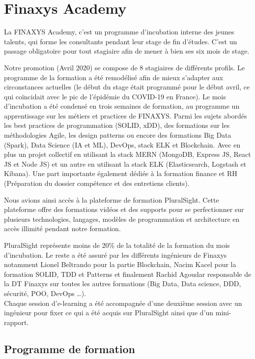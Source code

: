 \section{Finaxys Academy} 
\par La FINAXYS Academy, c’est un programme d'incubation interne des jeunes talents, qui forme les consultants pendant leur stage de fin d’études. C'est un passage obligatoire pour tout stagiaire afin de mener à bien ses six mois de stage. 
\par Notre promotion (Avril 2020) se compose de 8 stagiaires de différents profils. Le programme de la formation a été remodélisé afin de mieux s'adapter aux circonstances actuelles (le début du stage était programmé pour le début avril, ce qui coïncidait avec le pic de l'épidémie du COVID-19 en France). Le mois d'incubation a été condensé en trois semaines de formation, au programme un apprentissage sur les métiers et practices de FINAXYS. Parmi les sujets abordés les best practices de programmation (SOLID, xDD), des formations sur les méthodologies Agile, les design patterns ou encore des formations Big Data (Spark), Data Science (IA et ML), DevOps, stack ELK  et Blockchain. Avec en plus un projet collectif en utilisant la stack MERN (MongoDB, Express JS, React JS et Node JS) et un autre en utilisant la stack ELK (Elasticsearch, Logstash et Kibana). Une part importante également dédiée à la formation finance et RH (Préparation du dossier compétence et des entretiens clients). 
\par Nous avions ainsi accès à la plateforme de formation PluralSight. Cette plateforme offre des formations vidéos et des supports pour se perfectionner sur plusieurs technologies, langages, modèles de programmation et architecture en accès illimité pendant notre formation.
\par PluralSight représente moins de 20\% de la totalité de la formation du mois d'incubation. Le reste a été assuré par les différents ingénieurs de Finaxys notamment Lionel Beltrando pour la partie Blockchain, Nacim Kacel pour la formation SOLID, TDD et Patterns et finalement Rachid Agoudar responsable de la DT Finaxys sur toutes les autres formations (Big Data, Data science, DDD, sécurité, POO, DevOps \dots).  \\
Chaque session d'e-learning a été accompagnée d'une deuxième session avec un ingénieur pour fixer ce qui a été acquis sur PluralSight ainsi que d'un mini-rapport.

\subsection{Programme de formation}


